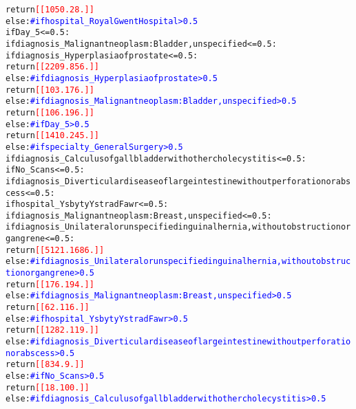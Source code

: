 \documentclass[thesis.tex]{subfiles}
\begin{document}
{\begin{alltt}
                        return \textcolor{red}{[[1050.   28.]]}
                    else:  \textcolor{blue}{# if hospital_Royal Gwent Hospital > 0.5}
                        if Day_5 <= 0.5:
                            if diagnosis_Malignant neoplasm: Bladder, unspecified <= 0.5:
                                if diagnosis_Hyperplasia of prostate <= 0.5:
                                    return \textcolor{red}{[[2209.  856.]]}
                                else:  \textcolor{blue}{# if diagnosis_Hyperplasia of prostate > 0.5}
                                    return \textcolor{red}{[[103. 176.]]}
                            else:  \textcolor{blue}{# if diagnosis_Malignant neoplasm: Bladder, unspecified > 0.5}
                                return \textcolor{red}{[[106. 196.]]}
                        else:  \textcolor{blue}{# if Day_5 > 0.5}
                            return \textcolor{red}{[[1410.  245.]]}
            else:  \textcolor{blue}{# if specialty_General Surgery > 0.5}
                if diagnosis_Calculus of gallbladder with other cholecystitis <= 0.5:
                    if No_Scans <= 0.5:
                        if diagnosis_Diverticular disease of large intestine without perforation or abscess <= 0.5:
                            if hospital_Ysbyty Ystrad Fawr <= 0.5:
                                if diagnosis_Malignant neoplasm: Breast, unspecified <= 0.5:
                                    if diagnosis_Unilateral or unspecified inguinal hernia, without obstruction or gangrene <= 0.5:
                                        return \textcolor{red}{[[5121. 1686.]]}
                                    else:  \textcolor{blue}{# if diagnosis_Unilateral or unspecified inguinal hernia, without obstruction or gangrene > 0.5}
                                        return \textcolor{red}{[[176. 194.]]}
                                else:  \textcolor{blue}{# if diagnosis_Malignant neoplasm: Breast, unspecified > 0.5}
                                    return \textcolor{red}{[[ 62. 116.]]}
                            else:  \textcolor{blue}{# if hospital_Ysbyty Ystrad Fawr > 0.5}
                                return \textcolor{red}{[[1282.  119.]]}
                        else:  \textcolor{blue}{# if diagnosis_Diverticular disease of large intestine without perforation or abscess > 0.5}
                            return \textcolor{red}{[[834.   9.]]}
                    else:  \textcolor{blue}{# if No_Scans > 0.5}
                        return \textcolor{red}{[[ 18. 100.]]}
                else:  \textcolor{blue}{# if diagnosis_Calculus of gallbladder with other cholecystitis > 0.5}

\end{alltt}}
\end{document}
